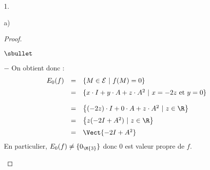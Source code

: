 \documentclass[11pt]{article}%
\begin{document}
\begin{noliste}{1.}
\begin{noliste}{a)}
\begin{proof}
\begin{noliste}{$\sbullet$}
\begin{noliste}{$-$}
    On obtient donc :
    \[
     \begin{array}{rcl}
      E_{0}(f) & = & \left\{ M\in\mathcal{E} \ | \ f(M)= 
      0 \right\}
      \\[.2cm]
      & = & \{ x \cdot I+y \cdot A+z \cdot A^2 \ | \
       x = -2z \mbox{ et }
       y = 0
      \}
      \\[.4cm]
      & = & \left\{ (-2z)\cdot I + 0 \cdot A + z \cdot A^2 
      \ | \ z\in\R\right\}
      \\[.2cm]
      & = & \left\{ z(-2I + A^2) 
      \ | \ z\in\R\right\}
      \\[.2cm]
      & = & \Vect{-2I+A^2}
     \end{array}
    \]
    En particulier, $E_{0}(f)\neq \{0_{\M{3}}\}$ donc $0$ est 
    valeur propre de $f$.
    

\end{noliste}
\end{noliste}
\end{proof}
\end{noliste}
\end{noliste}
\end{document}
